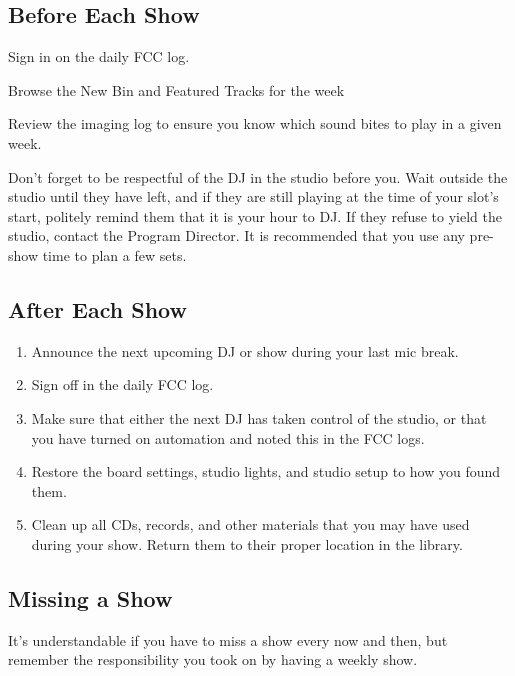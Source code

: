 \documentclass{witrman}
\begin{document}
\subsection{Before Each Show}
\begin{tightenumerate}
    \item Sign in on the daily FCC log.
    \item Browse the New Bin and Featured Tracks for the week
    \item Review the imaging log to ensure you know which sound bites to play in
        a given week.
\end{tightenumerate}

Don't forget to be respectful of the DJ in the studio before you.  Wait outside
the studio until they have left, and if they are still playing at the time of
your slot's start, politely remind them that it is your hour to DJ\@.  If they
refuse to yield the studio, contact the Program Director.  It is recommended
that you use any pre-show time to plan a few sets.

\subsection{After Each Show}
\begin{enumerate}
    \item Announce the next upcoming DJ or show during your last mic break.
    \item Sign off in the daily FCC log.
    \item Make sure that either the next DJ has taken control of the studio, or
        that you have turned on automation and noted this in the FCC logs.
    \item Restore the board settings, studio lights, and studio setup to how you
        found them.
    \item Clean up all CDs, records, and other materials that you may have used
        during your show.  Return them to their proper location in the library.
\end{enumerate}

\subsection{Missing a Show}

It's understandable if you have to miss a show every now and then, but remember
the responsibility you took on by having a weekly show.
\end{document}
